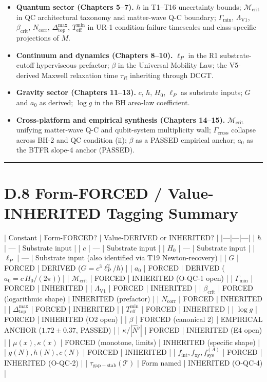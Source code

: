 \documentclass[11pt]{book}
\begin{document}
\begin{itemize}
\item \textbf{Quantum sector (Chapters 5–7).} $\hbar$ in T1–T16 uncertainty bounds; $\mathcal{M}_\mathrm{crit}$ in QC architectural taxonomy and matter-wave Q-C boundary; $\Gamma_\mathrm{min}$, $\Lambda_\mathrm{V1}$, $\beta_\mathrm{crit}$, $N_\mathrm{corr}$, $\Delta_\mathrm{top}^{\max}$, $T_\mathrm{eff}^{\min}$ in UR-1 condition-failure timescales and class-specific projections of $M$.
\item \textbf{Continuum and dynamics (Chapters 8–10).} $\ell_P$ in the R1 substrate-cutoff hyperviscous prefactor; $\beta$ in the Universal Mobility Law; the V5-derived Maxwell relaxation time $\tau_R$ inheriting through DCGT.
\item \textbf{Gravity sector (Chapters 11–13).} $c$, $\hbar$, $H_0$, $\ell_P$ as substrate inputs; $G$ and $a_0$ as derived; $\log g$ in the BH area-law coefficient.
\item \textbf{Cross-platform and empirical synthesis (Chapters 14–15).} $\mathcal{M}_\mathrm{crit}$ unifying matter-wave Q-C and qubit-system multiplicity wall; $\Gamma_\mathrm{cross}$ collapse across BH-2 and QC condition (ii); $\beta$ as a PASSED empirical anchor; $a_0$ as the BTFR slope-4 anchor (PASSED).
\end{itemize}

\bigskip\hrule\bigskip

\section{D.8 Form-FORCED / Value-INHERITED Tagging Summary}

| Constant | Form-FORCED? | Value-DERIVED or INHERITED? |
|---|---|---|
| $\hbar$ | — | Substrate input |
| $c$ | — | Substrate input |
| $H_0$ | — | Substrate input |
| $\ell_P$ | — | Substrate input (also identified via T19 Newton-recovery) |
| $G$ | FORCED | DERIVED ($G = c^3\ell_P^2/\hbar$) |
| $a_0$ | FORCED | DERIVED ($a_0 = c\,H_0/(2\pi)$) |
| $\mathcal{M}_\mathrm{crit}$ | FORCED | INHERITED (O-QC-1 open) |
| $\Gamma_\mathrm{min}$ | FORCED | INHERITED |
| $\Lambda_\mathrm{V1}$ | FORCED | INHERITED |
| $\beta_\mathrm{crit}$ | FORCED (logarithmic shape) | INHERITED (prefactor) |
| $N_\mathrm{corr}$ | FORCED | INHERITED |
| $\Delta_\mathrm{top}^{\max}$ | FORCED | INHERITED |
| $T_\mathrm{eff}^{\min}$ | FORCED | INHERITED |
| $\log g$ | FORCED | INHERITED (O2 open) |
| $\beta$ | FORCED (canonical 2) | EMPIRICAL ANCHOR ($1.72\pm 0.37$, PASSED) |
| $\kappa/|\hat{N}'|$ | FORCED | INHERITED (E4 open) |
| $\mu(x), \kappa(x)$ | FORCED (monotone, limits) | INHERITED (specific shape) |
| $g(N), h(N), c(N)$ | FORCED | INHERITED |
| $f_\mathrm{int}, f_\mathrm{xy}, f_\mathrm{sys}^{(A)}$ | FORCED | INHERITED (O-QC-2) |
| $\tau_\mathrm{gap-stab}(\mathcal{T})$ | Form named | INHERITED (O-QC-4) |
\end{document}
